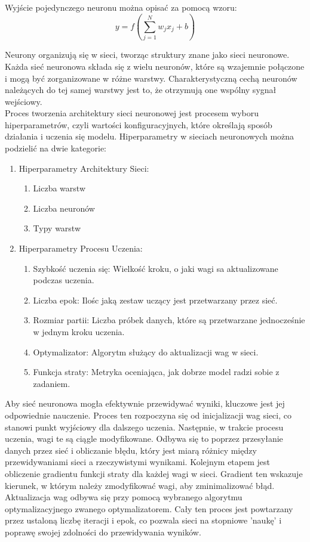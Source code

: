 \documentclass[a4paper,twoside,12pt]{book}
\begin{document}
Wyjście pojedynczego neuronu można opisać za pomocą wzoru:
\begin{equation}
	y = f\left(\sum_{j=1}^{N} w_j x_j + b\right)
\end{equation}

Neurony organizują się w sieci, tworząc struktury znane jako sieci neuronowe. Każda sieć neuronowa składa się z wielu neuronów, które są wzajemnie połączone i mogą być zorganizowane w różne warstwy. Charakterystyczną cechą neuronów należących do tej samej warstwy jest to, że otrzymują one wspólny sygnał wejściowy.\\

Proces tworzenia architektury sieci neuronowej jest procesem wyboru hiperparametrów, czyli wartości konfiguracyjnych, które określają sposób działania i uczenia się modelu. Hiperparametry w sieciach neuronowych można podzielić na dwie kategorie:

\begin{enumerate}
	\item Hiperparametry Architektury Sieci:
	      \begin{enumerate}
		      \item Liczba warstw
		      \item Liczba neuronów
		      \item Typy warstw
	      \end{enumerate}
	\item Hiperparametry Procesu Uczenia:
	      \begin{enumerate}
		      \item Szybkość uczenia się: Wielkość kroku, o jaki wagi sa aktualizowane podczas uczenia.
		      \item Liczba epok: Ilośc jaką zestaw uczący jest przetwarzany przez sieć.
		      \item Rozmiar partii: Liczba próbek danych, które są przetwarzane jednocześnie w jednym kroku uczenia.
		      \item Optymalizator: Algorytm służący do aktualizacji wag w sieci.
		      \item Funkcja straty: Metryka oceniająca, jak dobrze model radzi sobie z zadaniem.
	      \end{enumerate}
\end{enumerate}

Aby sieć neuronowa mogła efektywnie przewidywać wyniki, kluczowe jest jej odpowiednie nauczenie. Proces ten rozpoczyna się od inicjalizacji wag sieci, co stanowi punkt wyjściowy dla dalszego uczenia. Następnie, w trakcie procesu uczenia, wagi te są ciągle modyfikowane. Odbywa się to poprzez przesyłanie danych przez sieć i obliczanie błędu, który jest miarą różnicy między przewidywaniami sieci a rzeczywistymi wynikami. Kolejnym etapem jest obliczenie gradientu funkcji straty dla każdej wagi w sieci. Gradient ten wskazuje kierunek, w którym należy zmodyfikować wagi, aby zminimalizować błąd. Aktualizacja wag odbywa się przy pomocą wybranego algorytmu optymalizacyjnego zwanego optymalizatorem. Cały ten proces jest powtarzany przez ustaloną liczbę iteracji i epok, co pozwala sieci na stopniowe 'naukę' i poprawę swojej zdolności do przewidywania wyników.\cite{bib:ksiazka_sieci_algorytmy}
\end{document}
